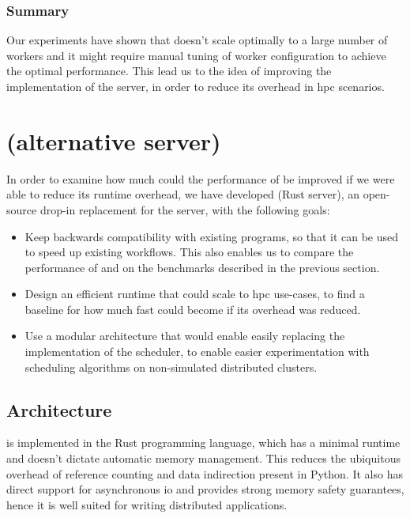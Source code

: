 \subsubsection*{Summary}
Our experiments have shown that \dask{} doesn't scale optimally to a large
number of workers and it might require manual tuning of worker configuration to achieve the optimal
performance. This lead us to the idea of improving the implementation of the
\dask{} server, in order to reduce its overhead in \gls{hpc}
scenarios.

\section{\rsds{} (alternative \dask{} server)}
\label{sec:rsds-description}
In order to examine how much could the performance of \dask{} be improved if we
were able to reduce its runtime overhead, we have developed \rsds{} (Rust \dask{} server), an
open-source drop-in replacement for the \dask{}
server, with the following goals:

\begin{itemize}
	\item Keep backwards compatibility with existing \dask{} programs, so that it can be
	      used to speed up existing workflows. This also enables us to compare the performance of
	      \rsds{} and \dask{} on the benchmarks described in the
	      previous section.
	\item Design an efficient runtime that could scale to \gls{hpc} use-cases, to find a
	      baseline for how much fast could \dask{} become if its overhead was reduced.
	\item Use a modular architecture that would enable easily replacing the implementation of the scheduler,
	      to enable easier experimentation with scheduling algorithms on non-simulated distributed clusters.
\end{itemize}

\subsection*{Architecture}
\rsds{} is implemented in the Rust programming language, which has a minimal
runtime and doesn't dictate automatic memory management. This reduces the ubiquitous overhead of
reference counting and data indirection present in Python. It also has direct support for
asynchronous \gls{io} and provides strong memory safety guarantees, hence it is
well suited for writing distributed applications.

